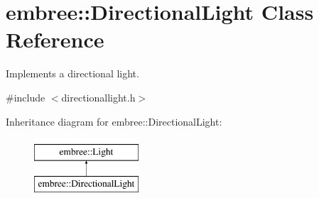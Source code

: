 \hypertarget{classembree_1_1_directional_light}{
\section{embree::DirectionalLight Class Reference}
\label{classembree_1_1_directional_light}
}


Implements a directional light.  




{\ttfamily \#include $<$directionallight.h$>$}

Inheritance diagram for embree::DirectionalLight:\begin{figure}[H]
\begin{center}
\leavevmode
\includegraphics[height=2.000000cm]{classembree_1_1_directional_light}
\end{center}
\end{figure}
